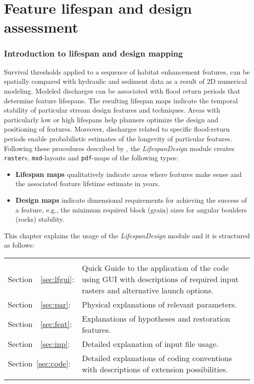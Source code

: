 \newpage
\part{Feature lifespan and design assessment}\label{part:lf}

\section{Introduction to lifespan and design mapping} \label{sec:lfintro}
Survival thresholds applied to a sequence of habitat enhancement features, can be spatially compared with hydraulic and sediment data as a result of 2D numerical modeling. Modeled discharges can be associated with flood return periods that determine feature lifespans. The resulting lifespan maps indicate the temporal stability of particular stream design features and techniques. Areas with particularly low or high lifespans help planners optimize the design and positioning of features. Moreover, discharges related to specific flood-return periods enable probabilistic estimates of the longevity of particular features. Following these procedures described by \citet{schwindt19a}, the \textit{LifespanDesign} module creates \texttt{raster}s, \texttt{mxd}-layouts and \texttt{pdf}-maps of the following types:
\begin{itemize}
	\item \textbf{Lifespan maps} qualitatively indicate areas where features make sense and the associated feature lifetime estimate in years.
	\item \textbf{Design maps} indicate dimensional requirements for achieving the success of a feature, e.g., the minimum required block (grain) sizes for angular boulders (rocks) stability.
\end{itemize}

This chapter explains the usage of the \textit{LifespanDesign} module and it is structured as follows:\\
\begin{tabular}{l L{0.9\textwidth}}
\\
Section~~\ref{sec:lfgui}: & Quick Guide to the application of the code using GUI with descriptions of required input rasters and alternative launch options.\\
Section~~\ref{sec:par}:   & Physical explanations of relevant parameters.\\
Section~~\ref{sec:feat}:  & Explanations of hypotheses and restoration features.\\
Section~~\ref{sec:inp}:   & Detailed explanation of input file usage.\\
Section~\ref{sec:code}:  & Detailed explanations of coding conventions with descriptions of extension possibilities.\\
\\
\end{tabular}


